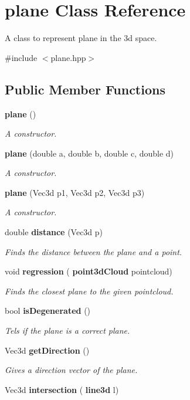 \section{plane Class Reference}
\label{classplane}


A class to represent plane in the 3d space.  




{\ttfamily \#include $<$plane.\+hpp$>$}

\subsection*{Public Member Functions}
\begin{DoxyCompactItemize}
\item 
\textbf{ plane} ()
\begin{DoxyCompactList}\small\item\em A constructor. \end{DoxyCompactList}\item 
\textbf{ plane} (double a, double b, double c, double d)
\begin{DoxyCompactList}\small\item\em A constructor. \end{DoxyCompactList}\item 
\textbf{ plane} (Vec3d p1, Vec3d p2, Vec3d p3)
\begin{DoxyCompactList}\small\item\em A constructor. \end{DoxyCompactList}\item 
double \textbf{ distance} (Vec3d p)
\begin{DoxyCompactList}\small\item\em Finds the distance between the plane and a point. \end{DoxyCompactList}\item 
void \textbf{ regression} (\textbf{ point3d\+Cloud} pointcloud)
\begin{DoxyCompactList}\small\item\em Finds the closest plane to the given pointcloud. \end{DoxyCompactList}\item 
bool \textbf{ is\+Degenerated} ()
\begin{DoxyCompactList}\small\item\em Tels if the plane is a correct plane. \end{DoxyCompactList}\item 
Vec3d \textbf{ get\+Direction} ()
\begin{DoxyCompactList}\small\item\em Gives a direction vector of the plane. \end{DoxyCompactList}\item 
Vec3d \textbf{ intersection} (\textbf{ line3d} l)
\end{DoxyCompactItemize}
